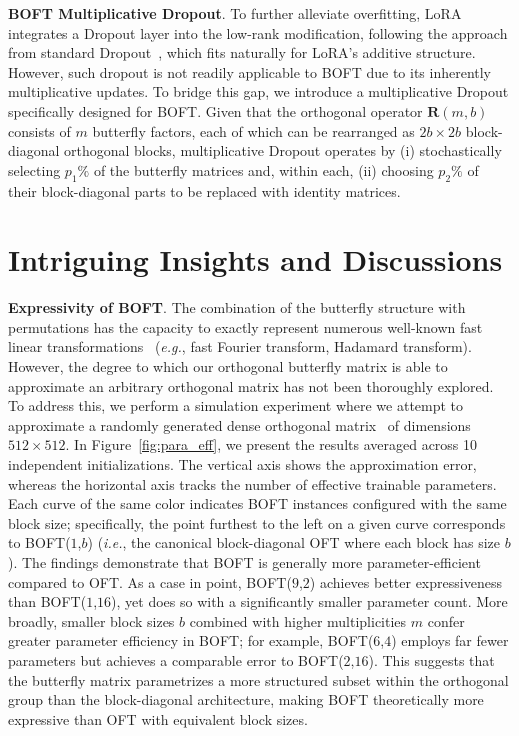 \textbf{BOFT Multiplicative Dropout}. To further alleviate overfitting, LoRA~\cite{hulora2022} integrates a Dropout layer into the low-rank modification, following the approach from standard Dropout~\cite{srivastava2014dropout}, which fits naturally for LoRA's additive structure. However, such dropout is not readily applicable to BOFT due to its inherently multiplicative updates. To bridge this gap, we introduce a multiplicative Dropout specifically designed for BOFT. Given that the orthogonal operator $\bm{R}(m,b)$ consists of $m$ butterfly factors, each of which can be rearranged as $2b \times 2b$ block-diagonal orthogonal blocks, multiplicative Dropout operates by (i) stochastically selecting $p_1\%$ of the butterfly matrices and, within each, (ii) choosing $p_2\%$ of their block-diagonal parts to be replaced with identity matrices.

\section{Intriguing Insights and Discussions}

\textbf{Expressivity of BOFT}. The combination of the butterfly structure with permutations has the capacity to exactly represent numerous well-known fast linear transformations~\cite{dao2019learning,dao2019kaleidoscope} (\emph{e.g.}, fast Fourier transform, Hadamard transform). However, the degree to which our orthogonal butterfly matrix is able to approximate an arbitrary orthogonal matrix has not been thoroughly explored. To address this, we perform a simulation experiment where we attempt to approximate a randomly generated dense orthogonal matrix~\cite{anderson1987generation} of dimensions $512\times 512$. In Figure~\ref{fig:para_eff}, we present the results averaged across 10 independent initializations. The vertical axis shows the approximation error, whereas the horizontal axis tracks the number of effective trainable parameters. Each curve of the same color indicates BOFT instances configured with the same block size; specifically, the point furthest to the left on a given curve corresponds to BOFT($1$,$b$) (\emph{i.e.}, the canonical block-diagonal OFT where each block has size $b$). The findings demonstrate that BOFT is generally more parameter-efficient compared to OFT. As a case in point, BOFT($9$,$2$) achieves better expressiveness than BOFT($1$,$16$), yet does so with a significantly smaller parameter count. More broadly, smaller block sizes $b$ combined with higher multiplicities $m$ confer greater parameter efficiency in BOFT; for example, BOFT($6$,$4$) employs far fewer parameters but achieves a comparable error to BOFT($2$,$16$). This suggests that the butterfly matrix parametrizes a more structured subset within the orthogonal group than the block-diagonal architecture, making BOFT theoretically more expressive than OFT with equivalent block sizes.

